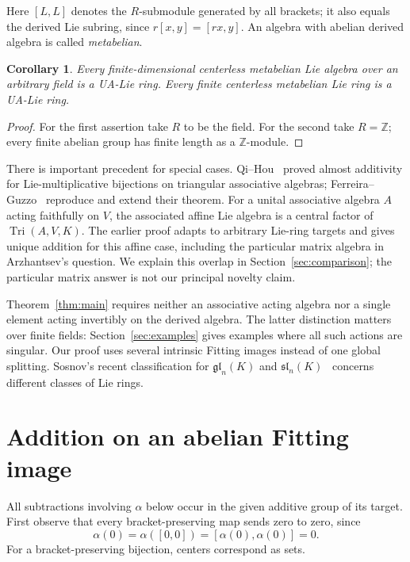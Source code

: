 \documentclass[11pt]{article}
\newtheorem{corollary}[theorem]{Corollary}
\theoremstyle{definition}
\DeclareMathOperator{\Tri}{Tri}
\begin{document}
Here $[L,L]$ denotes the $R$-submodule generated by all brackets; it also equals the derived Lie subring, since $r[x,y]=[rx,y]$. An algebra with abelian derived algebra is called \emph{metabelian}.

\begin{corollary}\label{cor:fields}
Every finite-dimensional centerless metabelian Lie algebra over an arbitrary field is a UA-Lie ring. Every finite centerless metabelian Lie ring is a UA-Lie ring.
\end{corollary}
\begin{proof}
For the first assertion take $R$ to be the field. For the second take $R=\mathbb Z$; every finite abelian group has finite length as a $\mathbb Z$-module.
\end{proof}

There is important precedent for special cases. Qi--Hou~\cite{QH} proved almost additivity for Lie-multiplicative bijections on triangular associative algebras; Ferreira--Guzzo~\cite{FG} reproduce and extend their theorem. For a unital associative algebra $A$ acting faithfully on $V$, the associated affine Lie algebra is a central factor of $\Tri(A,V,K)$. The earlier proof adapts to arbitrary Lie-ring targets and gives unique addition for this affine case, including the particular matrix algebra in Arzhantsev's question. We explain this overlap in Section~\ref{sec:comparison}; the particular matrix answer is not our principal novelty claim.

Theorem~\ref{thm:main} requires neither an associative acting algebra nor a single element acting invertibly on the derived algebra. The latter distinction matters over finite fields: Section~\ref{sec:examples} gives examples where all such actions are singular. Our proof uses several intrinsic Fitting images instead of one global splitting. Sosnov's recent classification for $\mathfrak{gl}_n(K)$ and $\mathfrak{sl}_n(K)$~\cite{Sos} concerns different classes of Lie rings.

\section{Addition on an abelian Fitting image}
All subtractions involving $\alpha$ below occur in the given additive group of its target. First observe that every bracket-preserving map sends zero to zero, since
\[
 \alpha(0)=\alpha([0,0])=[\alpha(0),\alpha(0)]=0.
\]
For a bracket-preserving bijection, centers correspond as sets.
\end{document}
